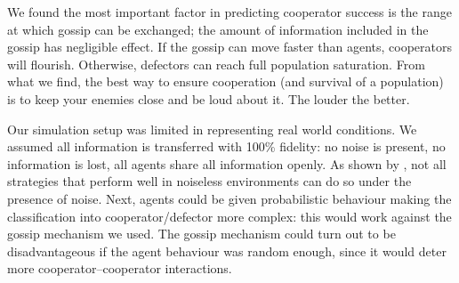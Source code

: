 \documentclass[english]{article}
\begin{document}
We found the most important factor in predicting cooperator success is the range at which gossip can be exchanged; the amount of information included in the gossip has negligible effect.
If the gossip can move faster than agents, cooperators will flourish. Otherwise, defectors can reach full population saturation.
From what we find, the best way to ensure cooperation (and survival of a population) is to keep your enemies close and be loud about it.
The louder the better.

Our simulation setup was limited in representing real world conditions.
We assumed all information is transferred with 100\% fidelity: no noise is present, no information is lost, all agents share all information openly.
As shown by \citet{noise}, not all strategies that perform well in noiseless environments can do so under the presence of noise.
Next, agents could be given probabilistic behaviour making the classification into cooperator/defector more complex: this would work against the gossip mechanism we used.
The gossip mechanism could turn out to be disadvantageous if the agent behaviour was random enough, since it would deter more cooperator--cooperator interactions.



\pagebreak

\end{document}
